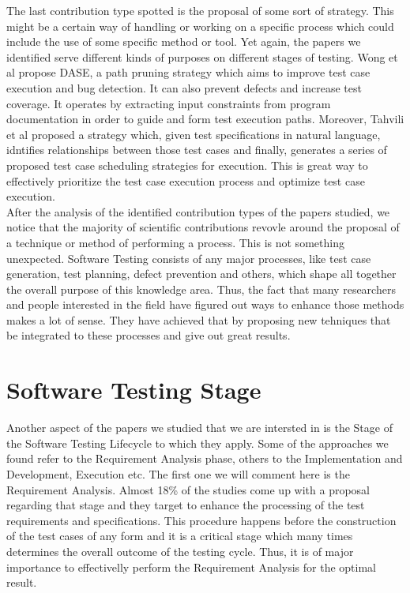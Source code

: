 The last contribution type spotted is the proposal of some sort of strategy. This might be a certain way of handling or working on a specific process which 
could include the use of some specific method or tool. Yet again, the papers we identified serve different kinds of purposes on different stages 
of testing. Wong et al \cite{wong2015dase} propose DASE, a path pruning strategy which aims to improve test case execution and bug detection. It can also prevent 
defects and increase test coverage. It operates by extracting input constraints from program documentation in order to guide and form test execution paths. 
Moreover, Tahvili et al \cite{10.1145/3195538.3195540} proposed a strategy which, given test specifications in natural language, idntifies relationships 
between those test cases and finally, generates a series of proposed test case scheduling strategies for execution. This is great way to effectively 
prioritize the test case execution process and optimize test case execution. \\

After the analysis of the identified contribution types of the papers studied, we notice that the majority of scientific contributions revovle around 
the proposal of a technique or method of performing a process. This is not something unexpected. Software Testing consists of any major processes, like 
test case generation, test planning, defect prevention and others, which shape all together the overall purpose of this knowledge area. Thus, the fact that 
many researchers and people interested in the field have figured out ways to enhance those methods makes a lot of sense. They have achieved 
that by proposing new tehniques that be integrated to these processes and give out great results.

\section {Software Testing Stage}
Another aspect of the papers we studied that we are intersted in is the Stage of the Software Testing Lifecycle to which they apply. Some of the approaches we found refer to 
the Requirement Analysis phase, others to the Implementation and Development, Execution etc. The first one we will comment here is the Requirement Analysis. Almost 18\% of the studies 
come up with a proposal regarding that stage and they target to enhance the processing of the test requirements and specifications. This procedure happens before the construction 
of the test cases of any form and it is a critical stage which many times determines the overall outcome of the testing cycle. Thus, it is of major importance to effectivelly 
perform the Requirement Analysis for the optimal result. \\

